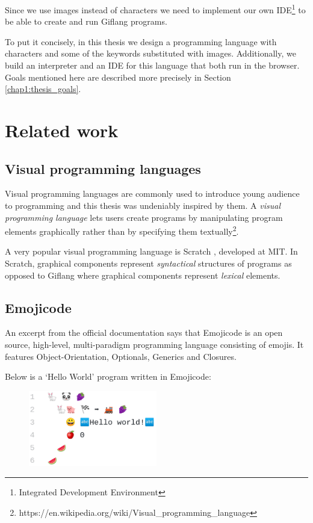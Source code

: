 Since we use images instead of characters we need to implement our own IDE\footnote{Integrated Development Environment} to be able to
create and run Giflang programs.

To put it concisely, in this thesis we design a programming language with characters and some of the keywords substituted with images.
Additionally, we build an interpreter and an IDE for this language that both run in the browser. Goals mentioned here are described
more precisely in Section \ref{chap1:thesis_goals}. 

\section{Related work}
\label{chap1:related_work}
\subsection{Visual programming languages}
Visual programming languages are commonly used to introduce young audience to programming and this thesis was undeniably inspired by them.
A \emph{visual programming language} lets users create programs by manipulating program elements graphically rather than by specifying them
textually\footnote{https://en.wikipedia.org/wiki/Visual\_programming\_language}.

A very popular visual programming language is Scratch \cite{Scratch}, developed at MIT. In Scratch, graphical components represent \emph{syntactical}
structures of programs as opposed to Giflang where graphical components represent \emph{lexical} elements.

\subsection{Emojicode}
An excerpt from the official documentation says that Emojicode \cite{Emojicode} is an open source, high-level, multi-paradigm programming language consisting of emojis.
It features Object-Orientation, Optionals, Generics and Closures.

Below is a `Hello World' program written in Emojicode:
\begin{figure}[!hbt]
	\includegraphics[width=0.5\textwidth]{../img/emojicode_helloworld}
	\label{fig:chap1:emojicode_helloworld}
\end{figure}


